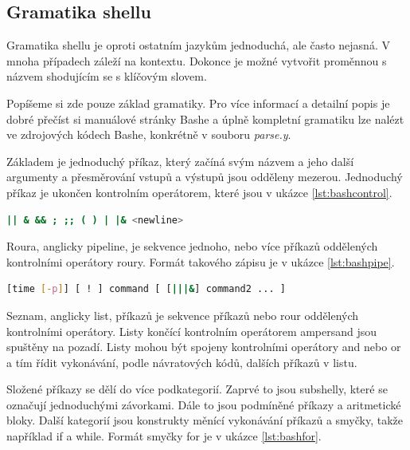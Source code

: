 \documentclass[thesis=M,czech]{FITthesis}[2012/06/26]
\begin{document}
%
%
%
\subsection{Gramatika shellu}

Gramatika shellu je oproti ostatním jazykům jednoduchá, ale často nejasná. V mnoha případech záleží na kontextu. Dokonce je možné vytvořit proměnnou s názvem shodujícím se s klíčovým slovem.

Popíšeme si zde pouze základ gramatiky. Pro více informací a detailní popis je dobré přečíst si manuálové stránky Bashe a úplně kompletní gramatiku lze nalézt ve zdrojových kódech Bashe, konkrétně v souboru \textit{parse.y}.

Základem je jednoduchý příkaz, který začíná svým názvem a jeho další argumenty a přesměrování vstupů a výstupů jsou odděleny mezerou. Jednoduchý příkaz je ukončen kontrolním operátorem, které jsou v ukázce \ref{lst:bashcontrol}.

\begin{minipage}{\linewidth}
\begin{lstlisting}[language=bash, caption={Kontrolní operátory v Bashi}, label={lst:bashcontrol}]
|| & && ; ;; ( ) | |& <newline>
\end{lstlisting}
\end{minipage}

Roura, anglicky pipeline, je sekvence jednoho, nebo více příkazů oddělených kontrolními operátory roury. Formát takového zápisu je v ukázce \ref{lst:bashpipe}.

\begin{minipage}{\linewidth}
\begin{lstlisting}[language=bash, caption={Formát roury v Bashi}, label={lst:bashpipe}]
[time [-p]] [ ! ] command [ [|||&] command2 ... ]
\end{lstlisting}
\end{minipage}

Seznam, anglicky list, 	příkazů je sekvence příkazů nebo rour oddělených kontrolními operátory. Listy končící kontrolním operátorem ampersand jsou spuštěny na pozadí. Listy mohou být spojeny kontrolními operátory and nebo or a tím řídit vykonávání, podle návratových kódů, dalších příkazů v listu.

Složené příkazy se dělí do více podkategorií. Zaprvé to jsou subshelly, které se označují jednoduchými závorkami. Dále to jsou podmíněné příkazy a aritmetické bloky. Další kategorií jsou konstrukty měnící vykonávání příkazů a smyčky, takže například if a while. Formát smyčky for je v ukázce \ref{lst:bashfor}.
\end{document}
